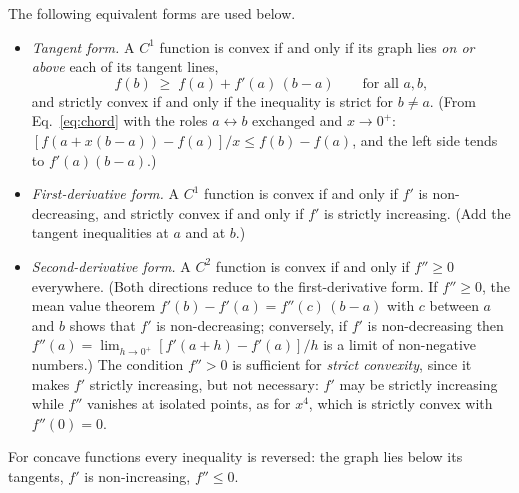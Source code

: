 \documentclass[10pt,a4paper]{article}
\theoremstyle{remark}
\begin{document}
The following equivalent forms are used below.
\begin{itemize}
\item \emph{Tangent form.} A $C^{1}$ function is convex if and only if its
graph lies \emph{on or above} each of its tangent lines,
\begin{equation}\label{eq:tangent}
  f(b)\;\geq\;f(a)+f'(a)\,(b-a) \qquad\text{for all } a,b ,
\end{equation}
and strictly convex if and only if the inequality is strict for $b\neq a$.
(From Eq.~\eqref{eq:chord} with the roles $a\leftrightarrow b$ exchanged and
$x\to0^{+}$: $[f(a+x(b-a))-f(a)]/x\leq f(b)-f(a)$, and the left side tends to
$f'(a)(b-a)$.)
\item \emph{First-derivative form.} A $C^{1}$ function is convex if and only if
$f'$ is non-decreasing, and strictly convex if and only if $f'$ is strictly
increasing. (Add the tangent inequalities at $a$ and at $b$.)
\item \emph{Second-derivative form.} A $C^{2}$ function is convex if and only
if $f''\geq0$ everywhere. (Both directions reduce to the first-derivative
form. If $f''\geq0$, the mean value theorem $f'(b)-f'(a)=f''(c)\,(b-a)$ with
$c$ between $a$ and $b$ shows that $f'$ is non-decreasing; conversely, if $f'$
is non-decreasing then $f''(a)=\lim_{h\to0^{+}}[f'(a+h)-f'(a)]/h$ is a limit
of non-negative numbers.) The condition $f''>0$ is sufficient for
\emph{strict convexity}, since it makes $f'$ strictly increasing, but not necessary:
$f'$ may be strictly increasing while $f''$ vanishes at isolated points, as for
$x^{4}$, which is strictly convex with $f''(0)=0$.
\end{itemize}
For concave functions every inequality is reversed: the graph lies below its
tangents, $f'$ is non-increasing, $f''\leq0$.
\end{document}
